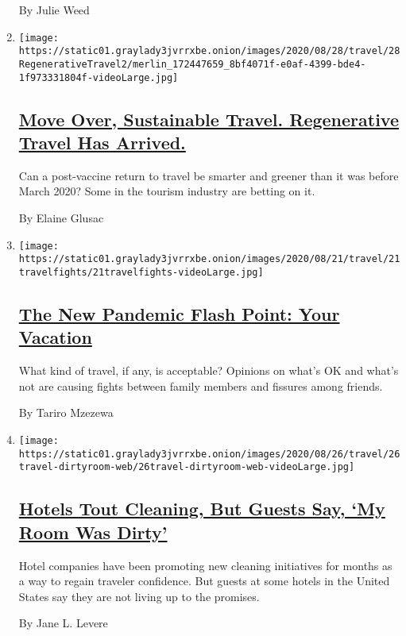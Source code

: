 \begin{enumerate}
  By Julie Weed
\item
  \texttt{[image: https://static01.graylady3jvrrxbe.onion/images/2020/08/28/travel/28RegenerativeTravel2/merlin\_172447659\_8bf4071f-e0af-4399-bde4-1f973331804f-videoLarge.jpg]}

  \hypertarget{move-over-sustainable-travel-regenerative-travel-has-arrived}{%
  \subsection{\texorpdfstring{\href{/2020/08/27/travel/travel-future-coronavirus-sustainable.html}{Move
  Over, Sustainable Travel. Regenerative Travel Has
  Arrived.}}{Move Over, Sustainable Travel. Regenerative Travel Has Arrived.}}\label{move-over-sustainable-travel-regenerative-travel-has-arrived}}

  Can a post-vaccine return to travel be smarter and greener than it was
  before March 2020? Some in the tourism industry are betting on it.

  By Elaine Glusac
\item
  \texttt{[image: https://static01.graylady3jvrrxbe.onion/images/2020/08/21/travel/21travelfights/21travelfights-videoLarge.jpg]}

  \hypertarget{the-new-pandemic-flash-point-your-vacation}{%
  \subsection{\texorpdfstring{\href{/2020/08/25/travel/vacation-travel-coronavirus.html}{The
  New Pandemic Flash Point: Your
  Vacation}}{The New Pandemic Flash Point: Your Vacation}}\label{the-new-pandemic-flash-point-your-vacation}}

  What kind of travel, if any, is acceptable? Opinions on what's OK and
  what's not are causing fights between family members and fissures
  among friends.

  By Tariro Mzezewa
\item
  \texttt{[image: https://static01.graylady3jvrrxbe.onion/images/2020/08/26/travel/26travel-dirtyroom-web/26travel-dirtyroom-web-videoLarge.jpg]}

  \hypertarget{hotels-tout-cleaning-but-guests-say-my-room-was-dirty}{%
  \subsection{\texorpdfstring{\href{/2020/08/26/travel/virus-hotels-cleaning.html}{Hotels
  Tout Cleaning, But Guests Say, `My Room Was
  Dirty'}}{Hotels Tout Cleaning, But Guests Say, `My Room Was Dirty'}}\label{hotels-tout-cleaning-but-guests-say-my-room-was-dirty}}

  Hotel companies have been promoting new cleaning initiatives for
  months as a way to regain traveler confidence. But guests at some
  hotels in the United States say they are not living up to the
  promises.

  By Jane L. Levere
\end{enumerate}

